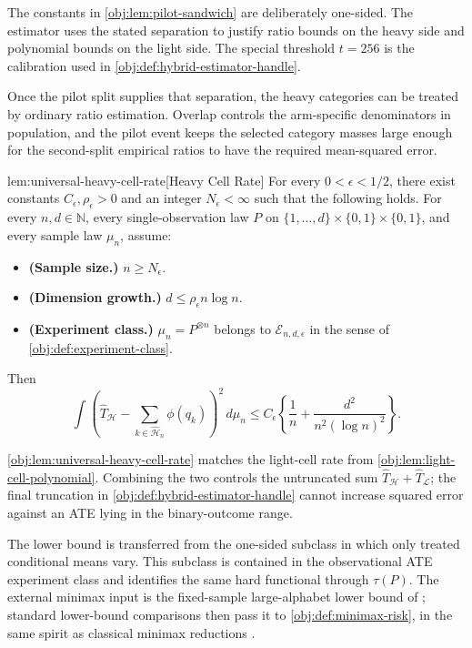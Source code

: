 The constants in \cref{obj:lem:pilot-sandwich} are deliberately one-sided. The estimator uses the stated separation to justify ratio bounds on the heavy side and polynomial bounds on the light side. The special threshold \(t=256\) is the calibration used in \cref{obj:def:hybrid-estimator-handle}.

Once the pilot split supplies that separation, the heavy categories can be treated by ordinary ratio estimation. Overlap controls the arm-specific denominators in population, and the pilot event keeps the selected category masses large enough for the second-split empirical ratios to have the required mean-squared error.

\begin{lemmav}{lem:universal-heavy-cell-rate}[Heavy Cell Rate]
For every \(0<\epsilon<1/2\), there exist constants \(C_\epsilon,\rho_\epsilon>0\) and an integer \(N_\epsilon<\infty\) such that the following holds.  For every \(n,d\in\mathbb N\), every single-observation law \(P\) on \(\{1,\ldots,d\}\times\{0,1\}\times\{0,1\}\), and every sample law \(\mu_n\), assume:
\begin{itemize}
\item \textbf{(Sample size.)} \(n\ge N_\epsilon\).
\item \textbf{(Dimension growth.)} \(d\le \rho_\epsilon n\log n\).
\item \textbf{(Experiment class.)} \(\mu_n=P^{\otimes n}\) belongs to \(\mathcal E_{n,d,\epsilon}\) in the sense of \cref{obj:def:experiment-class}.
\end{itemize}
Then
\[
\int \left(\widehat T_{\mathcal H}-\sum_{k\in\widehat{\mathcal H}_n}\phi(q_k)\right)^2\,d\mu_n
\le
C_\epsilon\left\{\frac1n+\frac{d^2}{n^2(\log n)^2}\right\}.
\]
\end{lemmav}

\cref{obj:lem:universal-heavy-cell-rate} matches the light-cell rate from \cref{obj:lem:light-cell-polynomial}. Combining the two controls the untruncated sum \(\widehat T_{\mathcal H}+\widehat T_{\mathcal L}\); the final truncation in \cref{obj:def:hybrid-estimator-handle} cannot increase squared error against an ATE lying in the binary-outcome range.

The lower bound is transferred from the one-sided subclass in which only treated conditional means vary. This subclass is contained in the observational ATE experiment class and identifies the same hard functional through \(\tau(P)\). The external minimax input is the fixed-sample large-alphabet lower bound of \citet{ZengBalakrishnanHanKennedy2024}; standard lower-bound comparisons then pass it to \cref{obj:def:minimax-risk}, in the same spirit as classical minimax reductions \citep{Tsybakov2009,CaiLow2011}.

